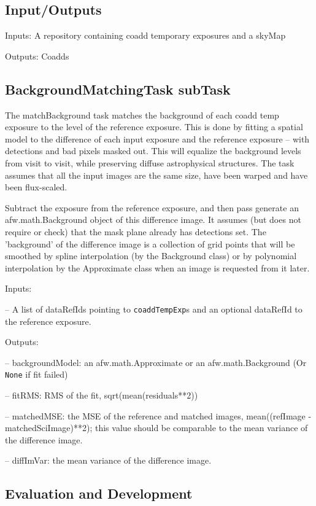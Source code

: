 \documentclass[12pt]{article}
\begin{document}
\subsection{Input/Outputs}

Inputs: A repository containing coadd temporary exposures and a skyMap

Outputs: Coadds

\subsection{BackgroundMatchingTask subTask} 
The matchBackground task matches the background of each coadd temp exposure to the level of the reference exposure.   This is done by fitting a spatial model to the difference of each input exposure and the reference exposure -- with detections and bad pixels masked out.  This will equalize the background levels from visit to visit, while preserving diffuse astrophysical structures.  The task assumes that all the input images are the same size, have been warped and have been flux-scaled. 

Subtract the exposure from the reference exposure, and then pass generate an afw.math.Background object of this difference image. It assumes (but does not require or check) that the mask plane already has detections set.  The 'background' of the difference image is a collection of grid points that will be smoothed by spline interpolation (by the Background class)  or by polynomial interpolation by the Approximate class when an image is requested from it later. 

Inputs: 

-- A list of dataRefIds  pointing to {\tt coaddTempExp}s and an optional dataRefId to the reference exposure. 

Outputs:  

-- backgroundModel: an afw.math.Approximate or an afw.math.Background (Or {\tt None} if fit failed) 

-- fitRMS: RMS of the fit, sqrt(mean(residuals**2))

-- matchedMSE: the MSE of the reference and matched images, mean((refImage - matchedSciImage)**2); 
   this value should be comparable to the mean variance of the difference image.

-- diffImVar: the mean variance of the difference image.

\subsection{Evaluation and Development}
\end{document}
